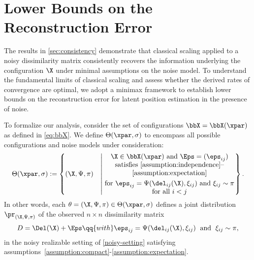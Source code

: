 \documentclass[10pt]{article}
\begin{document}




















\section{Lower Bounds on the Reconstruction Error}\label{sec:lower-bound}

The results in \cref{sec:consistency} demonstrate that classical scaling applied to a noisy dissimilarity matrix consistently recovers the information underlying the configuration $\X$ under minimal assumptions on the noise model. To understand the fundamental limits of classical scaling and assess whether the derived rates of convergence are optimal, we adopt a minimax framework to establish lower bounds on the reconstruction error for latent position estimation in the presence of noise.

To formalize our analysis, consider the set of configurations $\bbX = \bbX(\xpar)$ as defined in \cref{eq:bbX}. We define $\Theta(\xpar, \sigma)$ to encompass all possible configurations and noise models under consideration:
\begin{align}
    \Theta(\xpar, \sigma) :=
    \left\{
    (\X, \Psi, \pi) 
    \quad\middle\lvert\:
    \parbox{0.55\textwidth}{\centering
    $\X \in \bbX(\xpar)$ and $\Eps = (\eps_{ij})$ satisfies \ref{assumption:independence}--\ref{assumption:expectation}\\[3pt] for $\eps_{ij} = \Psi(\del_{ij}(\X), \xi_{ij})$ and $\xi_{ij} \sim \pi$ for all $i < j$
    }
    \right\}.\label{eq:Theta}
\end{align}
In other words, each $\theta = (\X, \Psi, \pi) \in \Theta(\xpar,\sigma)$ defines a joint distribution $\pr_{(\X, \Psi, \pi)}$ of the observed $n \times n$ dissimilarity matrix
\begin{align}
    D = \Del(\X) + \Eps \qq{with} \eps_{ij} = \Psi(\del_{ij}(\X), \xi_{ij})\;\text{ and }\; \xi_{ij} \sim \pi,
\end{align}
in the noisy realizable setting of \cref{noisy-setting} satisfying assumptions~\ref{assumption:compact}-\ref{assumption:expectation}.
\end{document}
